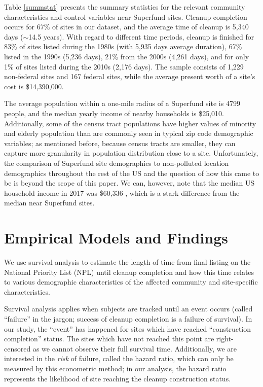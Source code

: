 \documentclass[12pt]{article}
\begin{document}
{Table \ref{summstat} presents the summary statistics for the relevant community characteristics and control variables near Superfund sites. Cleanup completion occurs for 67\% of sites in our dataset, and the average time of cleanup is 5,340 days ($\sim$14.5 years). With regard to different time periods, cleanup is finished for 83\% of sites listed during the 1980s (with 5,935 days average duration), 67\%  listed in the 1990s (5,236 days), 21\% from the 2000s (4,261 days), and for only 1\% of sites listed during the 2010s (2,176 days). The sample consists of 1,229 non-federal sites and 167 federal sites, 
while the average present worth of a site's cost is \$14,390,000. 

The average population within a one-mile radius of a Superfund site is 4799 people, and the median yearly income of nearby households is \$25,010. Additionally, some of the census tract populations have higher values of minority and elderly population than are commonly seen in typical zip code demographic variables; as mentioned before, because census tracts are smaller, they can capture more granularity in population distribution close to a site. Unfortunately, the comparison of Superfund site demographics to non-polluted location demographics throughout the rest of the US and the question of how this came to be is beyond the scope of this paper. We can, however, note that the median US household income in 2017 was \$60,336 \parencite{Guzman2018a}, which is a stark difference from the median near Superfund sites. 


\section{Empirical Models and Findings}\label{metrics}

We use survival analysis to estimate the length of time from final listing on the National Priority List (NPL) until cleanup completion and how this time relates to various demographic characteristics of the affected community and site-specific characteristics.  
\newcommand{\comm}{\mathrm{CommunityChars}_i}

Survival analysis applies when subjects are tracked until an event occurs (called ``failure'' in the jargon; success of cleanup completion is a failure of survival). In our study, the ``event'' has happened for sites which have reached ``construction completion'' status. The sites which have not reached this point are right-censored as we cannot observe their full survival time. Additionally, we are interested in the {\it risk} of failure, called the hazard ratio, which can only be measured by this econometric method; in our analysis, the hazard ratio represents the likelihood of site reaching the cleanup construction status. 

}
\end{document}
